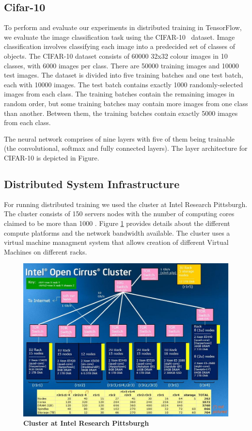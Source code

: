\subsection{Cifar-10}
To perform and evaluate our experiments in distributed training in TensorFlow, we evaluate the image classification task using the CIFAR-10~\cite{cifar10} dataset. Image classification involves classifying each image into a predecided set of classes of objects. The CIFAR-10 dataset consists of 60000 32x32 colour images in 10 classes, with 6000 images per class. There are 50000 training images and 10000 test images. The dataset is divided into five training batches and one test batch, each with 10000 images. The test batch contains exactly 1000 randomly-selected images from each class. The training batches contain the remaining images in random order, but some training batches may contain more images from one class than another. Between them, the training batches contain exactly 5000 images from each class. 

The neural network comprises of nine layers with five of them being trainable (the convolutional, softmax and fully connected layers). The layer architecture for CIFAR-10 is depicted in Figure. 

\subsection{Distributed System Infrastructure}

For running distributed training we used the cluster
at Intel Research Pittsburgh. The cluster consists 
of 150 servers nodes with the number of computing
cores claimed to be more than 1000 \cite{tashi}.
Figure \ref{fig:bigdata} provides details about the
different compute platforms and the network
bandwidth available. The cluster uses a virtual machine
managment system \cite{tashi} that allows creation of different Virtual
Machines on different racks.

\begin{figure}[h]
\centering
  \includegraphics[keepaspectratio,width=\columnwidth]{figures/bigdata.jpg}
  \caption{\textbf{Cluster at Intel Research Pittsburgh\cite{bigdatafig}}}
  \label{fig:bigdata}
\end{figure}



